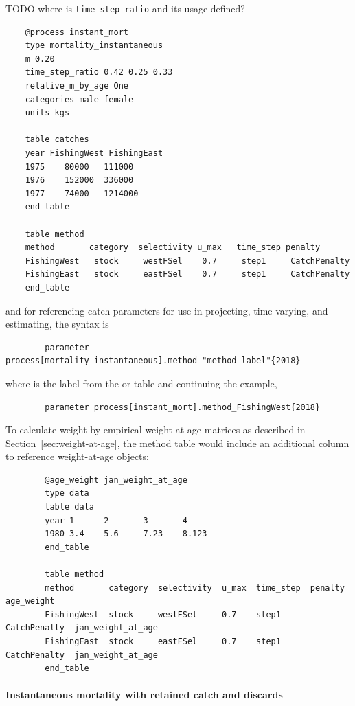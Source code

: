 TODO where is \texttt{time\_step\_ratio} and its usage defined?

{\small{\begin{verbatim}
	@process instant_mort
	type mortality_instantaneous
	m 0.20
	time_step_ratio 0.42 0.25 0.33
	relative_m_by_age One
	categories male female
	units kgs

	table catches
	year FishingWest FishingEast
	1975	80000	111000
	1976	152000	336000
	1977	74000	1214000
	end table

	table method
	method       category  selectivity u_max   time_step penalty
	FishingWest   stock     westFSel    0.7     step1     CatchPenalty
	FishingEast   stock     eastFSel    0.7     step1     CatchPenalty
	end_table
	\end{verbatim}}}

and for referencing catch parameters for use in projecting, time-varying, and estimating, the syntax is

{\small{\begin{verbatim}
		parameter process[mortality_instantaneous].method_"method_label"{2018}
\end{verbatim}}}

where  is the label from the  or  table and continuing the example,

{\small{\begin{verbatim}
		parameter process[instant_mort].method_FishingWest{2018}
\end{verbatim}}}

To calculate weight by empirical weight-at-age matrices as described in Section~\ref{sec:weight-at-age}, the method table would include an additional column to reference weight-at-age objects:

{\small{\begin{verbatim}
		@age_weight jan_weight_at_age
		type data
		table data
		year 1 		2 		3 		4
		1980 3.4	5.6		7.23 	8.123
		end_table

		table method
		method       category  selectivity  u_max  time_step  penalty       age_weight
		FishingWest  stock     westFSel     0.7    step1      CatchPenalty  jan_weight_at_age
		FishingEast  stock     eastFSel     0.7    step1      CatchPenalty  jan_weight_at_age
		end_table
\end{verbatim}}}


\paragraph{Instantaneous mortality with retained catch and discards}\label{sec:inst-mort-retained}

